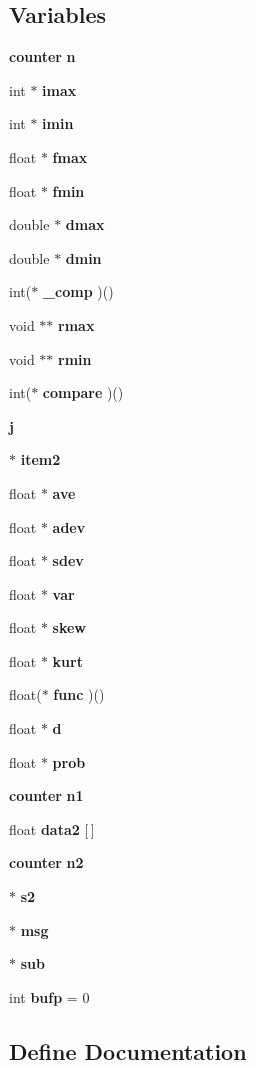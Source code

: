 \subsection*{Variables}
\begin{CompactItemize}
\item 
{\bf counter} {\bf n}
\item 
int $\ast$ {\bf imax}
\item 
int $\ast$ {\bf imin}
\item 
float $\ast$ {\bf fmax}
\item 
float $\ast$ {\bf fmin}
\item 
double $\ast$ {\bf dmax}
\item 
double $\ast$ {\bf dmin}
\item 
int($\ast$ {\bf \_\-comp} )()
\item 
void $\ast$$\ast$ {\bf rmax}
\item 
void $\ast$$\ast$ {\bf rmin}
\item 
int($\ast$ {\bf compare} )()
\item 
{\bf j}
\item 
$\ast$ {\bf item2}
\item 
float $\ast$ {\bf ave}
\item 
float $\ast$ {\bf adev}
\item 
float $\ast$ {\bf sdev}
\item 
float $\ast$ {\bf var}
\item 
float $\ast$ {\bf skew}
\item 
float $\ast$ {\bf kurt}
\item 
float($\ast$ {\bf func} )()
\item 
float $\ast$ {\bf d}
\item 
float $\ast$ {\bf prob}
\item 
{\bf counter} {\bf n1}
\item 
float {\bf data2} [$\,$]
\item 
{\bf counter} {\bf n2}
\item 
$\ast$ {\bf s2}
\item 
$\ast$ {\bf msg}
\item 
$\ast$ {\bf sub}
\item 
int {\bf bufp} = 0
\end{CompactItemize}


\subsection{Define Documentation}
